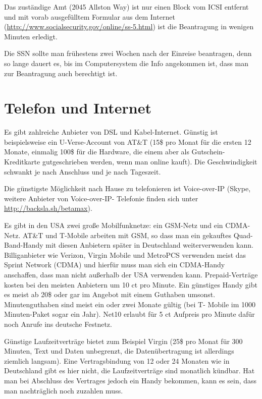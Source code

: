 \documentclass[a4paper]{scrreprt}
\begin{document}
Das zuständige Amt (2045 Allston Way) ist nur einen Block vom ICSI entfernt und mit vorab ausgefülltem Formular aus dem Internet (\url{http://www.socialsecurity.gov/online/ss-5.html}) ist die Beantragung in wenigen Minuten erledigt.

Die SSN sollte man frühestens zwei Wochen nach der Einreise beantragen, denn so lange dauert es, bis im Computersystem die Info angekommen ist, dass man zur Beantragung auch berechtigt ist.


\section{Telefon und Internet}

Es gibt zahlreiche Anbieter von DSL und Kabel-Internet. Günstig ist beispielsweise ein U-Verse-Account von AT\&T (15\$ pro Monat für die ersten 12 Monate, einmalig 100\$ für die Hardware, die einem aber als Gutschein-Kreditkarte gutgeschrieben werden, wenn man online kauft). Die Geschwindigkeit schwankt je nach Anschluss und je nach Tageszeit.

Die günstigste Möglichkeit nach Hause zu telefonieren ist Voice-over-IP (Skype, weitere Anbieter von Voice-over-IP- Telefonie finden sich unter  \url{http://backsla.sh/betamax}).

Es gibt in den USA zwei große Mobilfunknetze: ein GSM-Netz und ein CDMA-Netz. AT\&T und T-Mobile arbeiten mit GSM, so dass man ein gekauftes Quad-Band-Handy mit diesen Anbietern später in Deutschland weiterverwenden kann. Billiganbieter wie Verizon, Virgin Mobile und MetroPCS verwenden meist das Sprint Network (CDMA) und hierfür muss man sich ein CDMA-Handy anschaffen, dass man nicht außerhalb der USA verwenden kann.
Prepaid-Verträge kosten bei den meisten Anbietern um 10 ct pro Minute. Ein günstiges Handy gibt es meist ab 20\$ oder gar im Angebot mit einem Guthaben umsonst. Minutenguthaben sind meist ein oder zwei Monate gültig (bei T- Mobile im 1000 Minuten-Paket sogar ein Jahr). Net10 erlaubt für 5 ct Aufpreis pro Minute dafür noch Anrufe ins deutsche Festnetz.

Günstige Laufzeitverträge bietet zum Beispiel Virgin (25\$ pro Monat für 300 Minuten, Text und Daten unbegrenzt, die Datenübertragung ist allerdings ziemlich langsam). Eine Vertragsbindung von 12 oder 24 Monaten wie in Deutschland gibt es hier nicht, die Laufzeitverträge sind monatlich kündbar. Hat man bei Abschluss des Vertrages jedoch ein Handy bekommen, kann es sein, dass man nachträglich noch zuzahlen muss.
\end{document}
